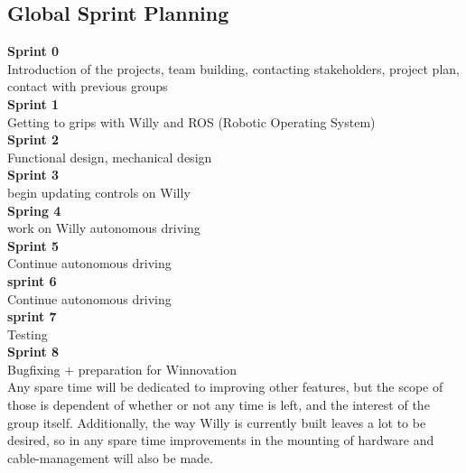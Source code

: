 \subsection{Global Sprint Planning}
\textbf{Sprint 0} \\
Introduction of the projects, team building, contacting stakeholders, project plan, contact with previous groups\\
\textbf{Sprint 1}\\
Getting to grips with Willy and ROS (Robotic Operating System)\\
\textbf{Sprint 2}\\
Functional design, mechanical design\\
\textbf{Sprint 3}\\
begin updating controls on Willy\\
\textbf{Spring 4}\\
work on Willy autonomous driving\\
\textbf{Sprint 5}\\
Continue autonomous driving\\
\textbf{sprint 6} \\
Continue autonomous driving\\
\textbf{sprint 7}\\
Testing\\
\textbf{Sprint 8}\\
Bugfixing + preparation for Winnovation \\

Any spare time will be dedicated to improving other features, but the scope of those is dependent of whether or not any time is left, and the interest of the group itself.
Additionally, the way Willy is currently built leaves a lot to be desired, so in any spare time improvements in the mounting of hardware and cable-management will also be made.

 \newpage
 